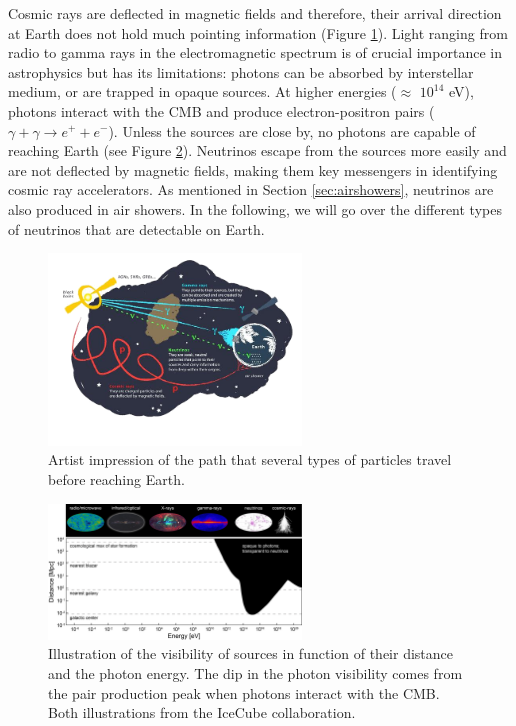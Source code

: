 Cosmic rays are deflected in magnetic fields and therefore, their arrival direction at Earth does not hold much pointing information (Figure \ref{fig:sourceinfo}). Light ranging from radio to gamma rays in the electromagnetic spectrum is of crucial importance in astrophysics but has its limitations: photons can be absorbed by interstellar medium, or are trapped in opaque sources. At higher energies ($\approx$ $10^{14}$ eV), photons interact with the CMB and produce electron-positron pairs ($\gamma + \gamma \rightarrow e^+ + e^-$). Unless the sources are close by, no photons are capable of reaching Earth (see Figure \ref{fig:opaquephotons}). Neutrinos escape from the sources more easily and are not deflected by magnetic fields, making them key messengers in identifying cosmic ray accelerators. As mentioned in Section \ref{sec:airshowers}, neutrinos are also produced in air showers. In the following, we will go over the different types of neutrinos that are detectable on Earth.


\begin{figure}[t]
\centering
\includegraphics[width=0.6\textwidth]{chapter3/img/sourceinformation_3.jpg}
\caption{Artist impression of the path that several types of particles travel before reaching Earth.}
\label{fig:sourceinfo}
\end{figure}

\begin{figure}[t]
\centering
\includegraphics[width=0.6\textwidth]{chapter3/img/opaque-to-photons.png}
\caption{Illustration of the visibility of sources in function of their distance and the photon energy. The dip in the photon visibility comes from the pair production peak when photons interact with the CMB. Both illustrations from the IceCube collaboration.}
\label{fig:opaquephotons}
\end{figure}

